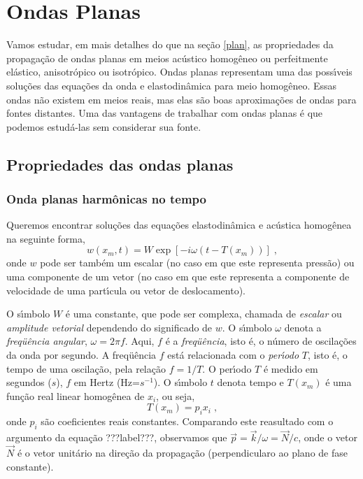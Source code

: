 \chapter{Ondas Planas} \label{ondplan}

Vamos estudar, em mais detalhes do que na se\c{c}\~ao \ref{plan},
as propriedades da propaga\c{c}\~ao de ondas planas em meios
ac\'ustico homog\^eneo ou perfeitmente el\'astico, anisotr\'opico
ou isotr\'opico. Ondas planas representam uma das poss\'{\i}veis
solu\c{c}\~oes das equa\c{c}\~oes da onda e elastodin\^amica para
meio homog\^eneo. Essas ondas n\~ao existem em meios reais, mas
elas s\~ao boas aproxima\c{c}\~oes de ondas para fontes distantes.
Uma das vantagens de trabalhar com ondas planas \'e que podemos
estud\'a-las sem considerar sua fonte.

\section{Propriedades das ondas planas}

\subsection{Onda planas harm\^onicas no tempo}

Queremos encontrar solu\c{c}\~oes das equa\c{c}\~oes
elastodin\^amica e ac\'ustica homog\^enea na seguinte forma,
\begin{equation}
w(x_m,t)=W\exp[-i\omega(t-T(x_m))] \;,
\end{equation}
onde $w$ pode ser tamb\'em um escalar (no caso em que este
representa press\~ao) ou uma componente de um vetor (no caso em
que este representa a componente de velocidade de uma
part\'{\i}cula ou vetor de deslocamento).

O s\'{\i}mbolo $W$ \'e uma constante, que pode ser complexa,
chamada de {\it escalar} ou {\it amplitude vetorial} dependendo do
significado de $w$. O s\'{\i}mbolo $\omega$ denota a {\it
freq\"u\^encia angular}, $\omega = 2\pi f$. Aqui, $f$ \'e a {\it
freq\"u\^encia}, isto \'e, o n\'umero de oscila\c{c}\~oes da onda
por segundo. A freq\"u\^encia $f$ est\'a relacionada com o {\it
per\'{\i}odo} $T$, isto \'e, o tempo de uma oscila\c{c}\~ao, pela
rela\c{c}\~ao $f = 1/T$. O per\'{\i}odo $T$ \'e medido em segundos
($s$), $f$ em Hertz (Hz=$s^{-1}$). O s\'{\i}mbolo $t$ denota tempo
e $T(x_m)$ \'e uma fun\c{c}\~ao real linear homog\^enea de $x_i$,
ou seja,
\begin{equation}
T(x_m)=p_i x_i \;,
\end{equation}
onde $p_i$ s\~ao coeficientes reais constantes. Comparando este
reasultado com o argumento da equa\c{c}\~ao ???label???,
observamos que $\vec{p}=\vec{k}/\omega=\vec{N}/c$, onde o vetor
$\vec{N}$ \'e o vetor unit\'ario na dire\c{c}\~ao da
propaga\c{c}\~ao (perpendicularo ao plano de fase constante).

